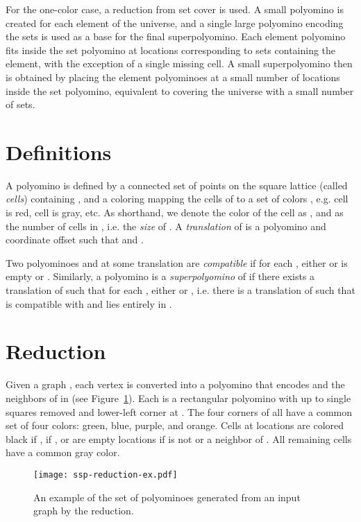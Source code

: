 \documentclass{article}
\begin{document}
For the one-color case, a reduction from set cover is used.
A small polyomino is created for each element of the universe, and a single large polyomino encoding the sets is used as a base for the final superpolyomino.
Each element polyomino fits inside the set polyomino at locations corresponding to sets containing the element, with the exception of a single missing cell.
A small superpolyomino then is obtained by placing the element polyominoes at a small number of locations inside the set polyomino, equivalent to covering the universe with a small number of sets.

\section{Definitions}

A polyomino  is defined by a connected set of points on the square lattice (called \emph{cells}) containing , and a coloring  mapping the cells of  to a set of colors , e.g. cell  is red, cell  is gray, etc.
As shorthand, we denote the color of the cell  as , and  as the number of cells in , i.e. the \emph{size} of .
A \emph{translation} of  is a polyomino  and coordinate offset  such that  and . 

Two polyominoes  and  at some translation  are \emph{compatible} if for each , either  or  is empty or .
Similarly, a polyomino  is a \emph{superpolyomino} of  if there exists a translation  of  such that for each , either  or , i.e. there is a translation of  such that  is compatible with  and lies entirely in . 

\section{Reduction}
\label{sec:reduction}

Given a graph , each vertex  is converted into a polyomino  that encodes  and the neighbors of  in  (see Figure~\ref{fig:reduction-ex}).
Each  is a rectangular  polyomino with up to  single squares removed and lower-left corner at . 
The four corners of all  have a common set of four colors: green, blue, purple, and orange.
Cells at locations  are colored black if ,  if , or are empty locations if  is not  or a neighbor of .
All remaining cells have a common gray color.

\begin{figure}[ht]
\centering
\texttt{[image: ssp-reduction-ex.pdf]}
\caption{An example of the set of polyominoes generated from an input graph by the reduction.}
\label{fig:reduction-ex}
\end{figure}
\end{document}
